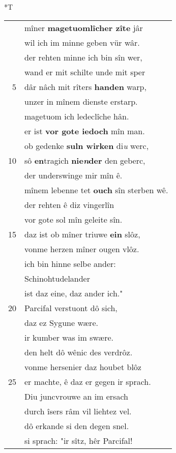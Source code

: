 \documentclass[8pt,a4paper,notitlepage]{article}
\begin{document}
\begin{table}[ht]
\begin{minipage}[t]{0.5\linewidth}
\end{minipage}
\hspace{0.5cm}
\begin{minipage}[t]{0.5\linewidth}
\small
\begin{center}*T
\end{center}
\begin{tabular}{rl}
 & mîner \textbf{magetuomlîcher zîte} jâr\\ 
 & wil ich im minne geben vür wâr.\\ 
 & der rehten minne ich bin sîn wer,\\ 
 & wand er mit schilte unde mit sper\\ 
5 & dâr nâch mit rîters \textbf{handen} warp,\\ 
 & unzer in mînem dienste erstarp.\\ 
 & magetuom ich ledeclîche hân.\\ 
 & er ist \textbf{vor gote iedoch} mîn man.\\ 
 & ob gedenke \textbf{suln wirken} di\textit{u} werc,\\ 
10 & sô \textbf{en}tragich \textbf{nie\textit{n}der} den geberc,\\ 
 & der underswinge mir mîn ê.\\ 
 & mînem lebenne tet \textbf{ouch} sîn sterben wê.\\ 
 & der rehten ê diz vingerlîn\\ 
 & vor gote sol mîn geleite sîn.\\ 
15 & daz ist ob mîner triuwe \textbf{ein} slôz,\\ 
 & vonme herzen mîner ougen vlôz.\\ 
 & ich bin hinne selbe ander:\\ 
 & Schinohtudelander\\ 
 & ist daz eine, daz ander ich."\\ 
20 & Parcifal verstuont dô sich,\\ 
 & daz ez Sygune wære.\\ 
 & ir kumber was im swære.\\ 
 & den helt dô wênic des verdrôz.\\ 
 & vonme hersenier daz houbet blôz\\ 
25 & er machte, ê daz er gegen ir sprach.\\ 
 & Diu juncvrouwe an im ersach\\ 
 & durch îsers râm vil liehtez vel.\\ 
 & dô erkande si den degen snel.\\ 
 & si sprach: "ir sîtz, hêr Parcifal!\\ 

\end{tabular}
\end{minipage}
\end{table}
\end{document}
